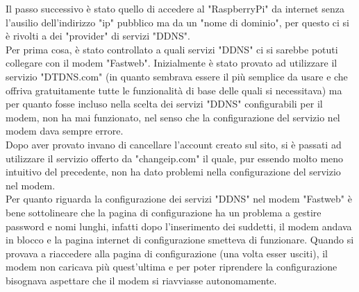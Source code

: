 Il passo successivo è stato quello di accedere al "RaspberryPi"  da internet senza l'ausilio dell'indirizzo "ip" pubblico ma da un "nome di dominio", per questo ci si è rivolti a dei "provider" di servizi "DDNS".\\
Per prima cosa, è stato controllato a quali servizi "DDNS" ci si sarebbe potuti collegare con il modem "Fastweb". Inizialmente è stato provato ad utilizzare il servizio "DTDNS.com" (in quanto sembrava essere il più semplice da usare e che offriva gratuitamente tutte le funzionalità di base delle quali si necessitava) ma per quanto fosse incluso nella scelta dei servizi "DDNS" configurabili per il modem, non ha mai funzionato, nel senso che la configurazione del servizio nel modem dava sempre errore.\\
Dopo aver provato invano di cancellare l'account creato sul sito, si è passati ad utilizzare il servizio offerto da "changeip.com" il quale, pur essendo molto meno intuitivo del precedente, non ha dato problemi nella configurazione del servizio nel modem.\\
Per quanto riguarda la configurazione dei servizi "DDNS" nel modem "Fastweb" è bene sottolineare che la pagina di configurazione ha un  problema a gestire password e nomi lunghi, infatti dopo l'inserimento dei suddetti, il modem andava in blocco e la pagina internet di configurazione smetteva di funzionare. Quando si provava a riaccedere alla pagina di configurazione (una volta esser usciti), il modem non caricava più quest'ultima e per poter riprendere la configurazione bisognava aspettare che il modem si riavviasse autonomamente.\\


